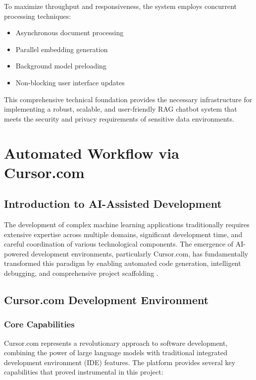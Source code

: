 To maximize throughput and responsiveness, the system employs concurrent processing techniques:

\begin{itemize}
    \item Asynchronous document processing
    \item Parallel embedding generation
    \item Background model preloading
    \item Non-blocking user interface updates
\end{itemize}

This comprehensive technical foundation provides the necessary infrastructure for implementing a robust, scalable, and user-friendly RAG chatbot system that meets the security and privacy requirements of sensitive data environments.

\newpage

\section{Automated Workflow via Cursor.com}

\subsection{Introduction to AI-Assisted Development}

The development of complex machine learning applications traditionally requires extensive expertise across multiple domains, significant development time, and careful coordination of various technological components. The emergence of AI-powered development environments, particularly Cursor.com, has fundamentally transformed this paradigm by enabling automated code generation, intelligent debugging, and comprehensive project scaffolding \citep{cursor2024}.

\subsection{Cursor.com Development Environment}

\subsubsection{Core Capabilities}

Cursor.com represents a revolutionary approach to software development, combining the power of large language models with traditional integrated development environment (IDE) features. The platform provides several key capabilities that proved instrumental in this project:

